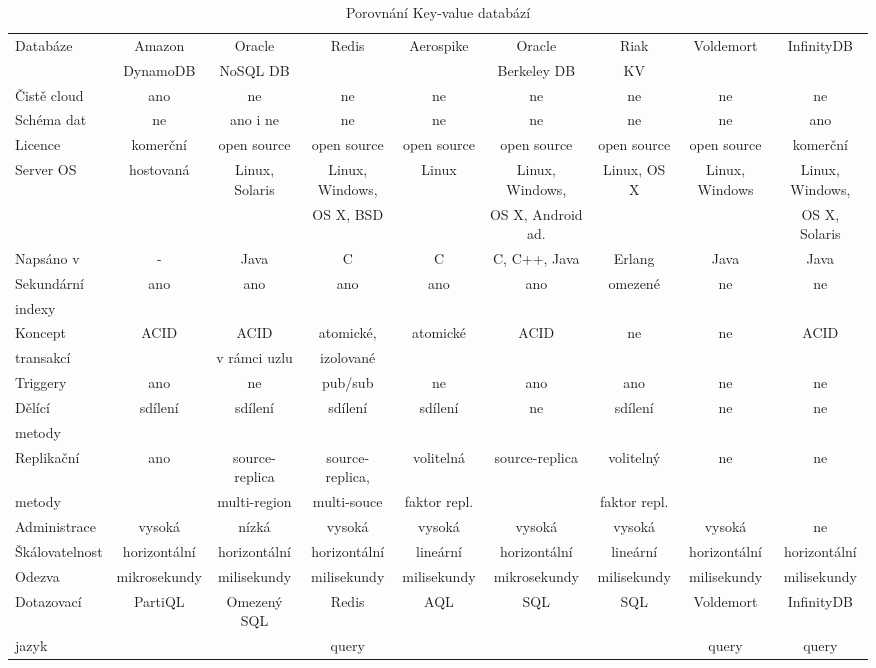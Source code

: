 \documentclass[czech,bachelor,dept460,male,csharp,cpdeclaration]{diploma}
\begin{document}
\begin{sidewaystable}
		\centering
		\caption{Porovnání Key-value databází}
		\label{tab_kvdb_compare}
		\scalebox{0.8}
		{
		\begin{tabular}{ l|c c c c c c c c } 
			\toprule
			Databáze & Amazon & Oracle & Redis & Aerospike & Oracle & Riak & Voldemort & InfinityDB \\
			& DynamoDB & NoSQL DB & & & Berkeley DB & KV & & \\
			\midrule
			Čistě cloud & ano & ne & ne & ne & ne & ne & ne & ne \\
			Schéma dat & ne & ano i ne & ne & ne & ne & ne & ne & ano \\
			Licence & komerční & open source & open source & open source & open source & open source & open source & komerční \\
			Server OS & hostovaná & Linux, Solaris & Linux, Windows, & Linux & Linux, Windows, & Linux, OS X & Linux, Windows &  Linux, Windows, \\
			& & & OS X, BSD & & OS X, Android ad. & & & OS X, Solaris\\
			Napsáno v & - & Java & C & C & C, C++, Java & Erlang & Java & Java\\
			Sekundární & ano & ano & ano & ano & ano & omezené & ne & ne \\
			indexy & & & & & & & & \\
			Koncept & ACID & ACID & atomické, & atomické & ACID & ne & ne & ACID \\
			transakcí & & v rámci uzlu & izolované & & & & & \\
			Triggery & ano & ne & pub/sub & ne & ano & ano & ne & ne \\
			Dělící & sdílení & sdílení & sdílení & sdílení & ne & sdílení & ne & ne \\ 
			metody \\
			Replikační & ano & source-replica & source-replica, & volitelná & source-replica & volitelný & ne & ne \\
			metody & & multi-region & multi-souce & faktor repl. & & faktor repl. \\
			Administrace & vysoká & nízká & vysoká & vysoká & vysoká & vysoká & vysoká & ne\\
			Škálovatelnost & horizontální & horizontální & horizontální & lineární & horizontální & lineární & horizontální & horizontální\\
			Odezva & mikrosekundy & milisekundy & milisekundy & milisekundy & mikrosekundy & milisekundy & milisekundy & milisekundy \\
			Dotazovací & PartiQL & Omezený SQL & Redis & AQL & SQL & SQL & Voldemort & InfinityDB \\
			jazyk & & & query & & & & query & query \\
			\bottomrule
		\end{tabular}
		}
\end{sidewaystable}
	
\end{document}
